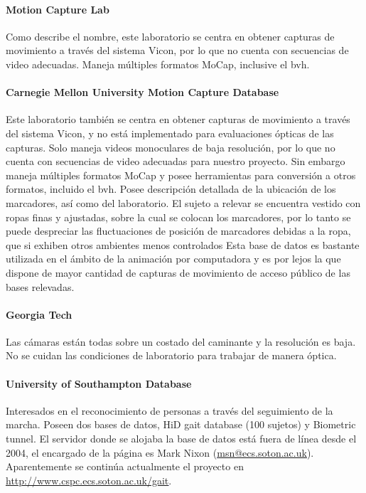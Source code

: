 \paragraph{Motion Capture Lab}
	Como describe el nombre, este laboratorio se centra en obtener capturas de movimiento a través del sistema Vicon, por lo que no cuenta con secuencias de video adecuadas. Maneja múltiples formatos MoCap, inclusive el bvh.



\paragraph{Carnegie Mellon University Motion Capture Database}
 Este laboratorio también se centra en obtener capturas de movimiento a través del sistema Vicon, y no está implementado para evaluaciones ópticas de las capturas. Solo maneja videos monoculares de baja resolución, por lo que no cuenta con secuencias de video adecuadas para nuestro proyecto. Sin embargo maneja múltiples formatos MoCap y  posee herramientas para conversión a otros formatos, incluido el bvh. Posee descripción detallada de la ubicación de los marcadores, así como del laboratorio. El sujeto a relevar se encuentra vestido con ropas finas y ajustadas, sobre la cual se colocan los marcadores, por lo tanto se puede despreciar las fluctuaciones de posición de marcadores debidas a la ropa, que si exhiben otros ambientes menos controlados  Esta base de datos es bastante utilizada en el ámbito de la  animación por computadora y es por lejos la que dispone de mayor cantidad de capturas de movimiento de acceso público de las bases relevadas.

\paragraph{Georgia Tech}
Las cámaras están todas sobre un costado del caminante y la resolución es baja. No se cuidan las condiciones de laboratorio para trabajar de manera óptica.


\paragraph{University of Southampton Database}
Interesados en el reconocimiento de personas a través del seguimiento de la marcha. Poseen dos bases de datos, HiD gait database  (100 sujetos) y Biometric tunnel. El servidor donde se alojaba la base de datos está fuera de línea desde el 2004, el encargado de la página es Mark Nixon (\textcolor{blue}{\underline{\url{msn@ecs.soton.ac.uk}}}). Aparentemente se continúa actualmente el proyecto en \textcolor{blue}{\underline{\url{http://www.cspc.ecs.soton.ac.uk/gait}}}.  

